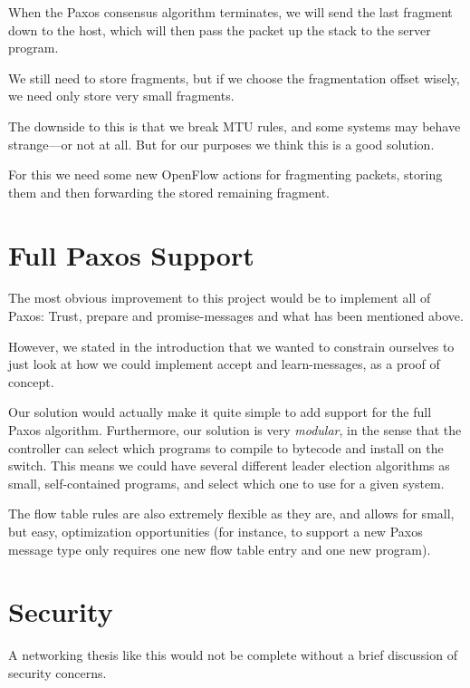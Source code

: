 When the Paxos consensus algorithm terminates, we will send the last
fragment down to the host, which will then pass the packet up the stack to
the server program.

We still need to store fragments, but if we choose the fragmentation offset
wisely, we need only store very small fragments.

The downside to this is that we break MTU rules, and some systems may behave
strange---or not at all.  But for our purposes we think this is a good
solution.

For this we need some new OpenFlow actions for fragmenting packets, storing
them and then forwarding the stored remaining fragment.

\section{Full Paxos Support}

The most obvious improvement to this project would be to implement all of
Paxos: Trust, prepare and
promise-messages and what has been mentioned above.

However, we stated in the introduction that we wanted to constrain ourselves
to just look at how we could implement accept and learn-messages, as a
proof of concept.

Our solution would actually make it quite simple to add support for the full
Paxos algorithm.  Furthermore, our solution is very \textit{modular}, in the
sense that the controller can select which programs to compile to bytecode
and install on the switch.  This means we could have several different
leader election algorithms as small, self-contained programs, and select
which one to use for a given system.

The flow table rules are also extremely flexible as they are, and allows for
small, but easy, optimization opportunities (for instance, to support a new
Paxos message type only requires one new flow table entry and one new
program).


\section{Security}

A networking thesis like this would not be complete without a brief
discussion of security concerns.

